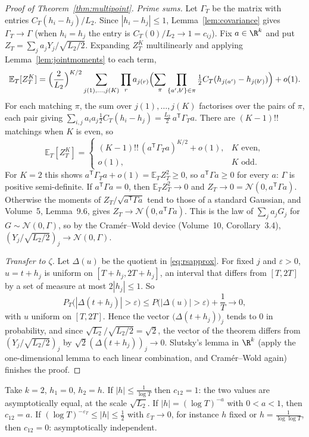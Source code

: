 \begin{proof}[Proof of Theorem~\ref{thm:multipoint}]
\emph{Prime sums.} Let $\Gamma_T$ be the matrix with entries $C_T(h_i-h_j)/L_2$. Since $|h_i-h_j|\le1$, Lemma~\ref{lem:covariance} gives $\Gamma_T\to\Gamma$ (when $h_i=h_j$ the entry is $C_T(0)/L_2\to1=c_{ij}$). Fix $a\in\R^k$ and put $Z_T=\sum_ja_jY_j/\sqrt{L_2/2}$. Expanding $Z_T^K$ multilinearly and applying Lemma~\ref{lem:jointmoments} to each term,
\[
\mathbb E_T[Z_T^K]=\Bigl(\frac2{L_2}\Bigr)^{K/2}\sum_{j(1),\dots,j(K)}\prod_ra_{j(r)}\Bigl(\sum_\pi\prod_{\{a',b'\}\in\pi}\tfrac12C_T(h_{j(a')}-h_{j(b')})\Bigr)+o(1).
\]
For each matching $\pi$, the sum over $j(1),\dots,j(K)$ factorises over the pairs of $\pi$, each pair giving $\sum_{i,j}a_ia_j\frac12C_T(h_i-h_j)=\frac{L_2}2\,a^{\mathsf T}\Gamma_Ta$. There are $(K-1)!!$ matchings when $K$ is even, so
\[
\mathbb E_T[Z_T^K]=\begin{cases}(K-1)!!\,(a^{\mathsf T}\Gamma_Ta)^{K/2}+o(1),&K\text{ even},\\o(1),&K\text{ odd}.\end{cases}
\]
For $K=2$ this shows $a^{\mathsf T}\Gamma_Ta+o(1)=\mathbb E_TZ_T^2\ge0$, so $a^{\mathsf T}\Gamma a\ge0$ for every $a$: $\Gamma$ is positive semi-definite. If $a^{\mathsf T}\Gamma a=0$, then $\mathbb E_TZ_T^2\to0$ and $Z_T\to0=\mathcal N(0,a^{\mathsf T}\Gamma a)$. Otherwise the moments of $Z_T/\sqrt{a^{\mathsf T}\Gamma a}$ tend to those of a standard Gaussian, and Volume~5, Lemma~9.6, gives $Z_T\to\mathcal N(0,a^{\mathsf T}\Gamma a)$. This is the law of $\sum_ja_jG_j$ for $G\sim\mathcal N(0,\Gamma)$, so by the Cram\'er--Wold device (Volume~10, Corollary~3.4), $(Y_j/\sqrt{L_2/2})_j\to\mathcal N(0,\Gamma)$.

\emph{Transfer to $\zeta$.} Let $\Delta(u)$ be the quotient in \eqref{eq:rsapprox}. For fixed $j$ and $\varepsilon>0$, $u=t+h_j$ is uniform on $[T+h_j,2T+h_j]$, an interval that differs from $[T,2T]$ by a set of measure at most $2|h_j|\le1$. So
\[
P_T\bigl(|\Delta(t+h_j)|>\varepsilon\bigr)\le P\bigl(|\Delta(u)|>\varepsilon\bigr)+\frac1T\longrightarrow0,
\]
with $u$ uniform on $[T,2T]$. Hence the vector $\bigl(\Delta(t+h_j)\bigr)_j$ tends to $0$ in probability, and since $\sqrt{L_2}/\sqrt{L_2/2}=\sqrt2$, the vector of the theorem differs from $(Y_j/\sqrt{L_2/2})_j$ by $\sqrt2(\Delta(t+h_j))_j\to0$. Slutsky's lemma in $\R^k$ (apply the one-dimensional lemma to each linear combination, and Cram\'er--Wold again) finishes the proof.
\end{proof}

\begin{example}\label{exa:regimes}
Take $k=2$, $h_1=0$, $h_2=h$. If $|h|\le\frac1{\log T}$ then $c_{12}=1$: the two values are asymptotically equal, at the scale $\sqrt{L_2}$. If $|h|=(\log T)^{-a}$ with $0<a<1$, then $c_{12}=a$. If $(\log T)^{-\varepsilon_T}\le|h|\le\frac12$ with $\varepsilon_T\to0$, for instance $h$ fixed or $h=\frac1{\log\log T}$, then $c_{12}=0$: asymptotically independent.
\end{example}

